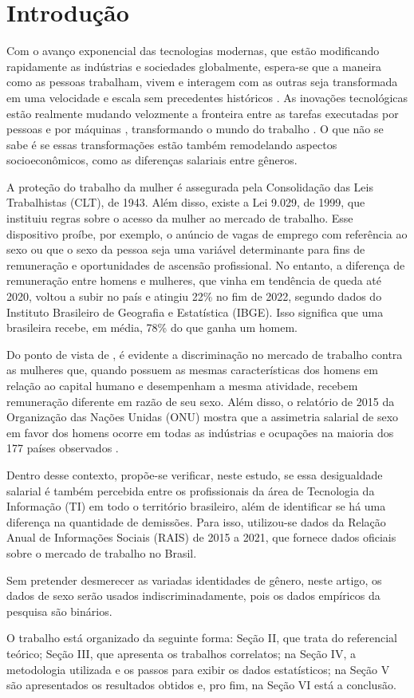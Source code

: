 \section{Introdução}

Com o avanço exponencial das tecnologias modernas, que estão modificando rapidamente as indústrias e sociedades globalmente, espera-se que a maneira como as pessoas trabalham, vivem e interagem com as outras seja transformada em uma velocidade e escala sem precedentes históricos \cite{hand1981artificial}. As inovações tecnológicas estão realmente mudando velozmente a fronteira entre as tarefas executadas por pessoas e por máquinas , transformando o mundo do trabalho \cite{aksoy2021robots}. O que não se sabe é se essas transformações estão também remodelando aspectos socioeconômicos, como as diferenças salariais entre gêneros.

A proteção do trabalho da mulher é assegurada pela Consolidação das Leis Trabalhistas (CLT), de 1943. Além disso, existe a Lei 9.029, de 1999, que instituiu regras sobre o acesso da mulher ao mercado de trabalho. Esse dispositivo proíbe, por exemplo, o anúncio de vagas de emprego com referência ao sexo ou que o sexo da pessoa seja uma variável determinante para fins de remuneração e oportunidades de ascensão profissional. No entanto, a diferença de remuneração entre homens e mulheres, que vinha em tendência de queda até 2020, voltou a subir no país e atingiu 22\% no fim de 2022, segundo dados do Instituto Brasileiro de Geografia e Estatística (IBGE). Isso significa que uma brasileira recebe, em média, 78\% do que ganha um homem.

Do ponto de vista de \cite{ahmed2015human}, é evidente a discriminação no mercado de trabalho contra as mulheres que, quando possuem as mesmas características dos homens em relação ao capital humano e desempenham a mesma atividade, recebem remuneração diferente em razão de seu sexo. Além disso, o relatório de 2015 da Organização das Nações Unidas (ONU) mostra que a assimetria salarial de sexo em favor dos homens ocorre em todas as indústrias e ocupações na maioria dos 177 países observados \cite{report2015onu}.

Dentro desse contexto, propõe-se verificar, neste estudo, se essa desigualdade salarial é também percebida entre os profissionais da área de Tecnologia da Informação (TI) em todo o território brasileiro, além de identificar se há uma diferença na quantidade de demissões. Para isso, utilizou-se dados da Relação Anual de Informações Sociais (RAIS) de 2015 a 2021, que fornece dados oficiais sobre o mercado de trabalho no Brasil. 

Sem pretender desmerecer as variadas identidades de gênero, neste artigo, os dados de sexo serão usados indiscriminadamente, pois os dados empíricos da pesquisa são binários. 

O trabalho está organizado da seguinte forma: Seção II, que trata do referencial teórico; Seção III, que apresenta os trabalhos correlatos; na Seção IV, a metodologia utilizada e os passos para exibir os dados estatísticos; na Seção V são apresentados os resultados obtidos e, pro fim, na Seção VI está a conclusão.